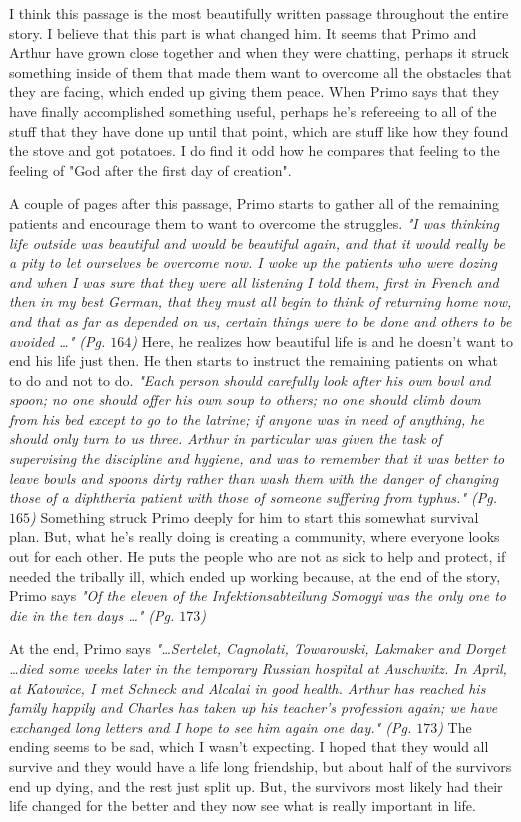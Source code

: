 I think this passage is the most beautifully written passage throughout the
entire story. I believe that this part is what changed him. It seems that Primo
and Arthur have grown close together and when they were chatting, perhaps it
struck something inside of them that made them want to overcome all the
obstacles that they are facing, which ended up giving them peace.
When Primo says that they have finally accomplished something useful, perhaps
he's refereeing to all of the stuff that they have done up until that point,
which are stuff like how they found the stove and got potatoes. I do find it odd
how he compares that feeling to the feeling of "God after the first day of
creation".

A couple of pages after this passage, Primo starts to gather all of the
remaining patients and encourage them to want to overcome the struggles.
\textit{"I was thinking life outside was beautiful and would be beautiful again,
and that it would really be a pity to let ourselves be overcome now. I woke up
the patients who were dozing and when I was sure that they were all listening
I told them, first in French and then in my best German, that they must all
begin to think of returning home now, and that as far as depended on us,
certain things were to be done and others to be avoided \ldots" (Pg. $164$)}
Here, he realizes how beautiful life is and he doesn't want to end his life just
then. He then starts to instruct the remaining patients on what to do and not to
do. \textit{"Each person should carefully look after his own bowl and
spoon; no one should offer his own soup to others; no one should climb down
from his bed except to go to the latrine; if anyone was in need of anything,
he should only turn to us three. Arthur in particular was given the task of
supervising the discipline and hygiene, and was to remember that it was
better to leave bowls and spoons dirty rather than wash them with the danger
of changing those of a diphtheria patient with those of someone suffering from
typhus." (Pg. $165$)} Something struck Primo deeply for him to start this
somewhat survival plan. But, what he's really doing is creating a community,
where everyone looks out for each other. He puts the people who are not as sick
to help and protect, if needed the tribally ill, which ended up working because,
at the end of the story, Primo says \textit{"Of the eleven of the
Infektionsabteilung Somogyi was the only one to die in the ten days \ldots" (Pg.
$173$)}

At the end, Primo says \textit{"\ldots Sertelet, Cagnolati, Towarowski, Lakmaker
and Dorget \ldots died some weeks later in the temporary Russian hospital at
Auschwitz. In April, at Katowice, I met Schneck and Alcalai in good health.
Arthur has reached his family happily and Charles has taken up his teacher's
profession again; we have exchanged long letters and I hope to see him again one
day." (Pg. $173$)} The ending seems to be sad, which I wasn't expecting. I hoped
that they would all survive and they would have a life long friendship, but
about half of the survivors end up dying, and the rest just split up. But, the
survivors most likely had their life changed for the better and they now see
what is really important in life.
